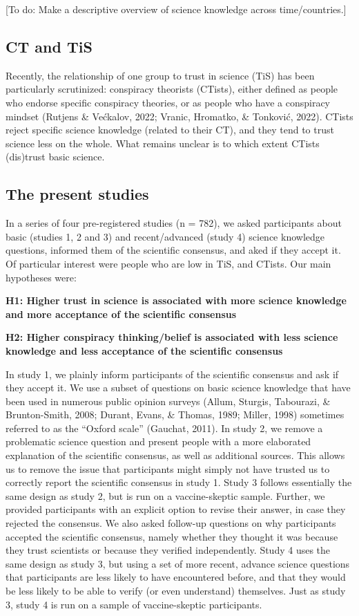 \documentclass[
  doc,floatsintext]{apa6}
\begin{document}
{[}To do: Make a descriptive overview of science knowledge across time/countries.{]}

\subsection{CT and TiS}\label{ct-and-tis}

Recently, the relationship of one group to trust in science (TiS) has been particularly scrutinized: conspiracy theorists (CTists), either defined as people who endorse specific conspiracy theories, or as people who have a conspiracy mindset (Rutjens \& Većkalov, 2022; Vranic, Hromatko, \& Tonković, 2022). CTists reject specific science knowledge (related to their CT), and they tend to trust science less on the whole. What remains unclear is to which extent CTists (dis)trust basic science.

\subsection{The present studies}\label{the-present-studies}

In a series of four pre-registered studies (n = 782), we asked participants about basic (studies 1, 2 and 3) and recent/advanced (study 4) science knowledge questions, informed them of the scientific consensus, and aked if they accept it. Of particular interest were people who are low in TiS, and CTists. Our main hypotheses were:

\textbf{H1: Higher trust in science is associated with more science knowledge and more acceptance of the scientific consensus}

\textbf{H2: Higher conspiracy thinking/belief is associated with less science knowledge and less acceptance of the scientific consensus}

In study 1, we plainly inform participants of the scientific consensus and ask if they accept it. We use a subset of questions on basic science knowledge that have been used in numerous public opinion surveys (Allum, Sturgis, Tabourazi, \& Brunton-Smith, 2008; Durant, Evans, \& Thomas, 1989; Miller, 1998) sometimes referred to as the ``Oxford scale'' (Gauchat, 2011). In study 2, we remove a problematic science question and present people with a more elaborated explanation of the scientific consensus, as well as additional sources. This allows us to remove the issue that participants might simply not have trusted us to correctly report the scientific consensus in study 1. Study 3 follows essentially the same design as study 2, but is run on a vaccine-skeptic sample. Further, we provided participants with an explicit option to revise their answer, in case they rejected the consensus. We also asked follow-up questions on why participants accepted the scientific consensus, namely whether they thought it was because they trust scientists or because they verified independently. Study 4 uses the same design as study 3, but using a set of more recent, advance science questions that participants are less likely to have encountered before, and that they would be less likely to be able to verify (or even understand) themselves. Just as study 3, study 4 is run on a sample of vaccine-skeptic participants.
\end{document}
